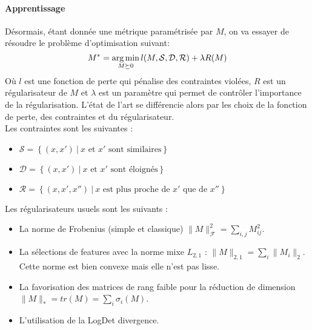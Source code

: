 \paragraph{Apprentissage}
Désormais, étant donnée une métrique paramétrisée par $M$, on va essayer de résoudre le problème d'optimisation suivant:
$$ M^*=\operatorname*{arg\,min}_{M \succeq 0} l(M, \mathcal{S}, \mathcal{D}, \mathcal{R}) + \lambda R(M) $$
Où $l$ est une fonction de perte qui pénalise des contraintes violées, $R$ est un régularisateur de $M$ et $\lambda$ est un paramètre qui permet de contrôler l'importance de la régularisation. L'état de l'art se différencie alors par les choix de la fonction de perte, des contraintes et du régularisateur. \\
Les contraintes sont les suivantes :
\begin{itemize}
	\item $\displaystyle \mathcal{S} = \left\{ (x, x')~|~x \text{ et } x' \text{ sont similaires} \right\}$
	\item $\displaystyle \mathcal{D} = \left\{ (x, x')~|~x \text{ et } x' \text{ sont éloignés} \right\}$
	\item $\displaystyle \mathcal{R} = \left\{ (x, x', x'')~|~x \text{ est plus proche de } x' \text{ que de } x'' \right\}$
\end{itemize}
Les régularisateurs usuels sont les suivants :
\begin{itemize}
	\item La norme de Frobenius (simple et classique) $\| M \|_\mathcal{F}^2 = \sum_{i, j} M_{ij}^2$.
	\item La sélections de features avec la norme mixe $L_{2, 1}$ : $\| M \|_{2, 1} = \sum_i \| M_i \|_2$. \\ Cette norme est bien convexe mais elle n'est pas lisse.
	\item La favorisation des matrices de rang faible pour la réduction de dimension \\
		$\| M \|_* = tr(M) = \sum_i \sigma_i(M) $.
	\item L'utilisation de la LogDet divergence.
\end{itemize}

